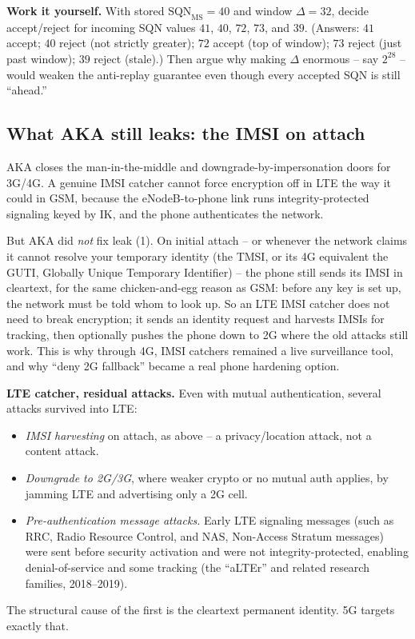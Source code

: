 \begin{labbox}
\textbf{Work it yourself.} With stored $\text{SQN}_{\text{MS}}=40$ and window $\Delta=32$, decide accept/reject for incoming SQN values $41$, $40$, $72$, $73$, and $39$. (Answers: $41$ accept; $40$ reject (not strictly greater); $72$ accept (top of window); $73$ reject (just past window); $39$ reject (stale).) Then argue why making $\Delta$ enormous -- say $2^{28}$ -- would weaken the anti-replay guarantee even though every accepted SQN is still ``ahead.''
\end{labbox}

\subsection{What AKA still leaks: the IMSI on attach}
\label{ch29:aka-imsi}

AKA closes the man-in-the-middle and downgrade-by-impersonation doors for 3G/4G. A genuine IMSI catcher cannot force encryption off in LTE the way it could in GSM, because the eNodeB-to-phone link runs integrity-protected signaling keyed by IK, and the phone authenticates the network.

But AKA did \emph{not} fix leak (1). On initial attach -- or whenever the network claims it cannot resolve your temporary identity (the TMSI, or its 4G equivalent the GUTI, Globally Unique Temporary Identifier) -- the phone still sends its IMSI in cleartext, for the same chicken-and-egg reason as GSM: before any key is set up, the network must be told whom to look up. So an LTE IMSI catcher does not need to break encryption; it sends an identity request and harvests IMSIs for tracking, then optionally pushes the phone down to 2G where the old attacks still work. This is why through 4G, IMSI catchers remained a live surveillance tool, and why ``deny 2G fallback'' became a real phone hardening option.

\begin{attackbox}
\textbf{LTE catcher, residual attacks.} Even with mutual authentication, several attacks survived into LTE:
\begin{itemize}
  \item \emph{IMSI harvesting} on attach, as above -- a privacy/location attack, not a content attack.
  \item \emph{Downgrade to 2G/3G}, where weaker crypto or no mutual auth applies, by jamming LTE and advertising only a 2G cell.
  \item \emph{Pre-authentication message attacks.} Early LTE signaling messages (such as RRC, Radio Resource Control, and NAS, Non-Access Stratum messages) were sent before security activation and were not integrity-protected, enabling denial-of-service and some tracking (the ``aLTEr'' and related research families, 2018--2019).
\end{itemize}
The structural cause of the first is the cleartext permanent identity. 5G targets exactly that.
\end{attackbox}

